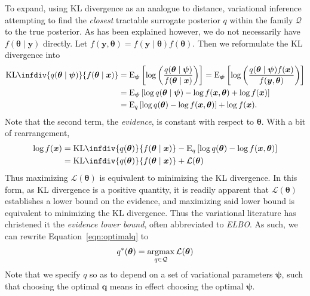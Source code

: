 To expand, using KL divergence as an analogue to distance, variational inference attempting 
    to find the \emph{closest} tractable surrogate posterior $q$ within the family 
    $\mathcal{Q}$ to the true posterior.  
    As has been explained however, we do not necessarily have 
    $f(\bm{\theta}\mid\bm{y})$ directly.  Let 
    $f(\bm{y},\bm{\theta}) = f(\bm{y}\mid\bm{\theta})f(\bm{\theta})$.
    Then we reformulate the KL divergence into
    \[
        \begin{aligned}
        \text{KL}\infdiv{q(\bm{\theta}\mid\bm{\psi})}{f(\bm{\theta}\mid\bm{x})}
            &=\text{E}_{\bm{\psi}}\left[\log\left(
                \frac{q(\bm{\theta}\mid\bm{\psi})}{f(\bm{\theta}\mid\bm{x})}
                \right)\right] = \text{E}_{\bm{\psi}}\left[
                \log\left(\frac{q(\bm{\theta}\mid\bm{\psi})f(\bm{x})}{f(\bm{y},\bm{\theta})}
                \right)\right]\\
            &= \text{E}_{\bm{\psi}}\left[
                \log q(\bm{\theta}\mid\bm{\psi}) - \log f(\bm{x},\bm{\theta}) 
                + \log f(\bm{x})
                \right]\\
            &= \text{E}_{q}\left[
                \log q(\bm{\theta}) - \log f(\bm{x},\bm{\theta})\right] + 
                   \log f(\bm{x}).
        \end{aligned}
    \]
    Note that the second term, the \emph{evidence}, is constant with respect to 
    $\bm{\theta}$.  With a bit of rearrangement,
    \[
        \begin{aligned}
        \log f(\bm{x}) 
            &= \text{KL}\infdiv{q(\bm{\theta})}{f(\bm{\theta}\mid\bm{x})}
                - \text{E}_q\left[
                \log q(\bm{\theta}) - \log f(\bm{x},\bm{\theta})
                \right]\\
            &= \text{KL}\infdiv{q(\bm{\theta})}{f(\bm{\theta}\mid\bm{x})}
                + \mathcal{L}(\bm{\theta})
        \end{aligned}
    \]
    Thus maximizing $\mathcal{L}(\bm{\theta})$ is equivalent to minimizing the 
    KL divergence. In this form, as KL divergence is a positive quantity, it is
    readily apparent that $\mathcal{L}(\bm{\theta})$ establishes a lower bound
    on the evidence, and maximizing said lower bound is equivalent to minimizing
    the KL divergence.  Thus the variational literature has christened it the
    \emph{evidence lower bound}, often abbreviated to \emph{ELBO}.  As such,
    we can rewrite Equation~\eqref{eqn:optimalq} to
    \[
        q^*(\bm{\theta}) = \operatorname*{argmax}_{q\in\mathcal{Q}} \mathcal{L}(\bm{\theta})
    \]
    Note that we specify $q$ so as to depend on a set of variational parameters 
    $\bm{\psi}$, such that choosing the optimal $\bm{q}$ means in effect choosing
    the optimal $\bm{\psi}$.  

